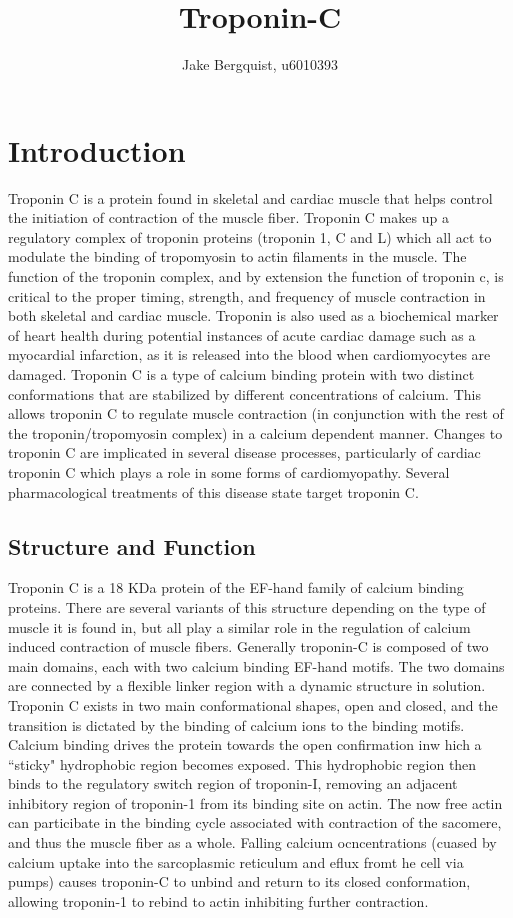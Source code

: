 \documentclass[12pt]{article}
\begin{document}
\title{Troponin-C }
\author{Jake Bergquist, u6010393 }
\maketitle

\section{Introduction}
Troponin C is a protein found in skeletal and cardiac muscle that helps control the initiation of contraction of the muscle fiber. Troponin C makes up a regulatory complex of troponin proteins (troponin 1, C and L) which all act to modulate the binding of tropomyosin to actin filaments in the muscle. The function of the troponin complex, and by extension the function of troponin c, is critical to the proper timing, strength, and frequency of muscle contraction in both skeletal and cardiac muscle. Troponin is also used as a biochemical marker of heart health during potential instances of acute cardiac damage such as a myocardial infarction, as it is released into the blood when cardiomyocytes are damaged. Troponin C is a type of calcium binding protein with two distinct conformations that are stabilized by different concentrations of calcium. This allows troponin C to regulate muscle contraction (in conjunction with the rest of the troponin/tropomyosin complex) in a calcium dependent manner. Changes to troponin C are implicated in several disease processes, particularly of cardiac troponin C which plays a role in some forms of cardiomyopathy. Several pharmacological treatments of this disease state target troponin C.

\subsection{Structure and Function}
Troponin C is a 18 KDa  protein of the EF-hand family of calcium binding proteins. There are several variants of this structure depending on the type of muscle it is found in, but all play a similar role in the regulation of calcium induced contraction of muscle fibers. Generally troponin-C is composed of two main domains, each with two calcium binding EF-hand motifs. The two domains are connected by a flexible linker region with a dynamic structure in solution. Troponin C exists in two main conformational shapes, open and closed, and the transition is dictated by the binding of calcium ions to the binding motifs. Calcium binding drives the protein towards the open confirmation inw hich a ``sticky" hydrophobic region becomes exposed. This hydrophobic region then binds to the regulatory switch region of troponin-I, removing an adjacent inhibitory region of troponin-1 from its binding site on actin. The now free actin can particibate in the binding cycle associated with contraction of the sacomere, and thus the muscle fiber as a whole. Falling calcium ocncentrations (cuased by calcium uptake into the sarcoplasmic reticulum and eflux fromt he cell via pumps) causes troponin-C to unbind and return to its closed conformation, allowing troponin-1 to rebind to actin inhibiting further contraction. 
\end{document}
